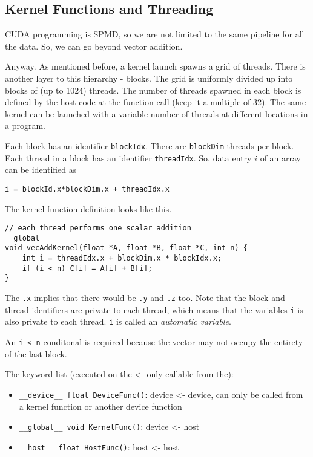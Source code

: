 \subsection*{Kernel Functions and Threading}
CUDA programming is SPMD, so we are not limited to the same pipeline
for all the data. So, we can go beyond vector addition.

Anyway. As mentioned before, a kernel launch spawns a grid of threads.
There is another layer to this hierarchy - blocks. The grid is uniformly
divided up into blocks of (up to 1024) threads. The number of
threads spawned in each block is defined by the host code at the
function call (keep it a multiple of 32). The same kernel can be
launched with a variable
number of threads at different locations in a program.

Each block has an identifier \texttt{blockIdx}. There are
\texttt{blockDim} threads per block. Each thread in a block has
an identifier \texttt{threadIdx}. So, data entry $i$ of an array
can be identified as
\begin{verbatim}
i = blockId.x*blockDim.x + threadIdx.x 
\end{verbatim}

The kernel function definition looks like this.
\begin{verbatim}
// each thread performs one scalar addition
__global__
void vecAddKernel(float *A, float *B, float *C, int n) {
    int i = threadIdx.x + blockDim.x * blockIdx.x;
    if (i < n) C[i] = A[i] + B[i];
}
\end{verbatim}
The \texttt{.x} implies that there would be \texttt{.y} and 
\texttt{.z} too. Note that the block and thread identifiers are
private to each thread, which means that the variables \texttt{i}
is also private to each thread. \texttt{i} is called an \textit{
    automatic variable}.

An \texttt{i < n} conditonal is required because the vector may not
occupy the entirety of the last block.

The keyword list (executed on the <- only callable from the):
\begin{itemize}
    \item \texttt{\_\_device\_\_ float DeviceFunc()}: device <- device, can only be called from a kernel function or another device function
    \item \texttt{\_\_global\_\_ void KernelFunc()}: device <- host
    \item \texttt{\_\_host\_\_ float HostFunc()}: host <- host
\end{itemize}

